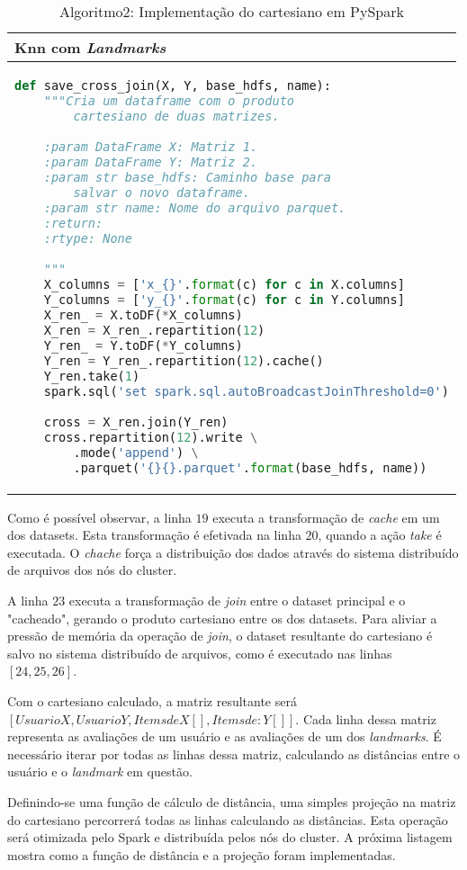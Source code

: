\documentclass[12pt]{article}
\begin{document}
\begin{table}[ht]
	\begin{tabular}{l}
		Knn com \textit{Landmarks} \\ \hline
\begin{lstlisting}[language=Python]
def save_cross_join(X, Y, base_hdfs, name):
	"""Cria um dataframe com o produto 
		cartesiano de duas matrizes.
	
	:param DataFrame X: Matriz 1.
	:param DataFrame Y: Matriz 2.
	:param str base_hdfs: Caminho base para 
		salvar o novo dataframe.
	:param str name: Nome do arquivo parquet.
	:return:
	:rtype: None
	
	"""
	X_columns = ['x_{}'.format(c) for c in X.columns]
	Y_columns = ['y_{}'.format(c) for c in Y.columns]
	X_ren_ = X.toDF(*X_columns)
	X_ren = X_ren_.repartition(12)
	Y_ren_ = Y.toDF(*Y_columns)
	Y_ren = Y_ren_.repartition(12).cache()
	Y_ren.take(1)
	spark.sql('set spark.sql.autoBroadcastJoinThreshold=0')
	
	cross = X_ren.join(Y_ren)
	cross.repartition(12).write \
		.mode('append') \
		.parquet('{}{}.parquet'.format(base_hdfs, name))
\end{lstlisting}	
	\end{tabular}
	\caption{Algoritmo2: Implementação do cartesiano em PySpark}
	\label{tab:code1}
\end{table}

Como é possível observar, a linha $19$ executa a transformação de \textit{cache} em um dos datasets. Esta transformação é efetivada na linha $20$, quando a ação \textit{take} é executada. O \textit{chache} força a distribuição dos dados através do sistema distribuído de arquivos dos nós do cluster. 

A linha $23$ executa a transformação de \textit{join} entre o dataset principal e o "cacheado", gerando o produto cartesiano entre os dos datasets. Para aliviar a pressão de memória da operação de \textit{join}, o dataset resultante do cartesiano é salvo no sistema distribuído de arquivos, como é executado nas linhas $[24, 25, 26]$.

Com o cartesiano calculado, a matriz resultante será $[Usuario X, Usuario Y, Items de X[], Items de :Y[]]$. Cada linha dessa matriz representa as avaliações de um usuário e as avaliações de um dos \textit{landmarks}. É necessário iterar por todas as linhas dessa matriz, calculando as distâncias entre o usuário e o \textit{landmark} em questão.

Definindo-se uma função de cálculo de distância, uma simples projeção na matriz do cartesiano percorrerá todas as linhas calculando as distâncias. Esta operação será otimizada pelo Spark e distribuída pelos nós do cluster. A próxima listagem mostra como a função de distância e a projeção foram implementadas.
\end{document}
